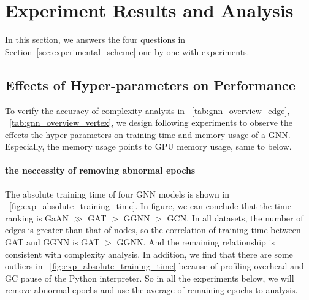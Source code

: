 \section{Experiment Results and Analysis}
\label{sec:experiment_results}

In this section, we answers the four questions in Section~\ref{sec:experimental_scheme} one by one with experiments.

\subsection{Effects of Hyper-parameters on Performance}
\label{sec:effects_of_hyper-parameters_on_performance}

To verify the accuracy of complexity analysis in \tablename~\ref{tab:gnn_overview_edge}, \tablename~\ref{tab:gnn_overview_vertex}, we 
design following experiments to observe the effects the hyper-parameters on training time and memory usage of a GNN. Especially, the memory usage
points to GPU memory usage, same to below.

\paragraph{the neccessity of removing abnormal epochs}
The absolute training time of four GNN models is shown in \figurename~\ref{fig:exp_absolute_training_time}.
In figure, we can conclude that the time ranking is GaAN $\gg$ GAT $>$ GGNN $>$ GCN. In all datasets, the number of edges is greater than that of nodes, so the correlation of training time between GAT and GGNN is
GAT $>$ GGNN. And the remaining relationship is consistent with complexity analysis. In addition, we find that there are some outliers in \figurename~\ref{fig:exp_absolute_training_time} because of profiling overhead
and GC pause of the Python interpreter. So in all the experiments below, we will remove abnormal epochs and use the average of remaining epochs to analysis.

